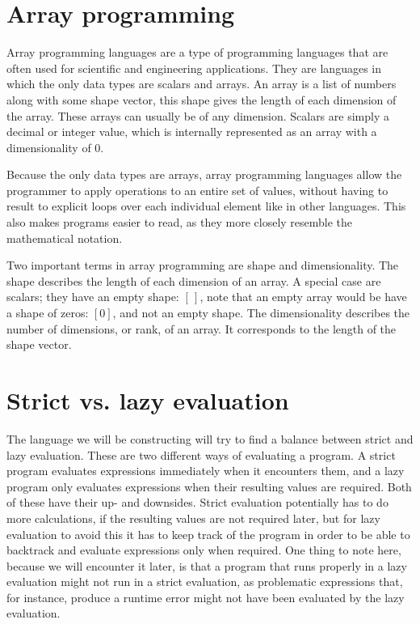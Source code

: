 \documentclass[../main.tex]{subfiles}
\begin{document}
\section{Array programming}
Array programming languages are a type of programming languages that are often used for scientific and engineering applications. They are languages in which the only data types are scalars and arrays.
An array is a list of numbers along with some shape vector, this shape gives the length of each dimension of the array. These arrays can usually be of any dimension.
Scalars are simply a decimal or integer value, which is internally represented as an array with a dimensionality of 0.

Because the only data types are arrays, array programming languages allow the programmer to apply operations to an entire set of values, without having to result to explicit loops over each individual element like in other languages. This also makes programs easier to read, as they more closely resemble the mathematical notation.

Two important terms in array programming are shape and dimensionality.
The shape describes the length of each dimension of an array. A special case are scalars; they have an empty shape: $[\,]$, note that an empty array would be have a shape of zeros: $[0]$, and not an empty shape.
The dimensionality describes the number of dimensions, or rank, of an array. It corresponds to the length of the shape vector.

\section{Strict vs. lazy evaluation}
The language we will be constructing will try to find a balance between strict and lazy evaluation. These are two different ways of evaluating a program.
A strict program evaluates expressions immediately when it encounters them, and a lazy program only evaluates expressions when their resulting values are required.
Both of these have their up- and downsides. Strict evaluation potentially has to do more calculations, if the resulting values are not required later, but for lazy evaluation to avoid this it has to keep track of the program in order to be able to backtrack and evaluate expressions only when required. One thing to note here, because we will encounter it later, is that a program that runs properly in a lazy evaluation might not run in a strict evaluation, as problematic expressions that, for instance, produce a runtime error might not have been evaluated by the lazy evaluation.
\end{document}
